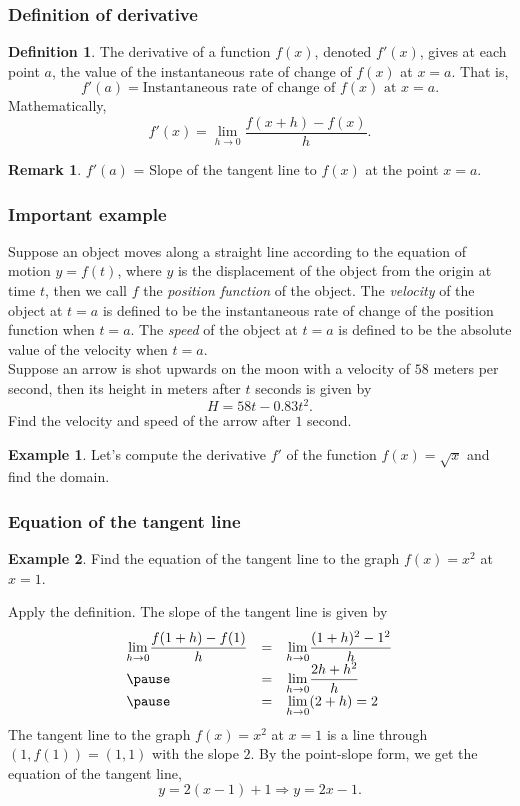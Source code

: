 \documentclass[t]{beamer}
\theoremstyle{plain}
\theoremstyle{definition}
\newtheorem{dfn}{Definition}
\newtheorem{rem}[prop]{Remark}
\newtheorem{ex}{Example}[section]
\newcommand{\nin}{\noindent}
\newcommand{\disp}{\displaystyle}
\begin{document}
\frame
{
\frametitle{Definition of derivative}
\begin{dfn}
The derivative of a function $f(x)$, denoted $f'(x)$, gives at each point $a$, the value of the instantaneous rate of change of $f(x)$ at $x=a$.
That is, \[ f'(a)=\text{Instantaneous rate of change of }f(x)\text{ at }x=a.\]\pause
Mathematically,
\[ f'(x)=\lim_{h\to 0}\frac{f(x+h)-f(x)}{h}.\]
\end{dfn}
\begin{rem}
$f'(a)$ = Slope of the tangent line to $f(x)$ at the point $x=a$.
\end{rem}
}

\begin{frame}
\frametitle{Important example}

\noindent Suppose an object moves along a straight line according to the equation of motion $y = f(t)$, where $y$ is the displacement of the object from the origin at time $t$, then we call $f$ the \emph{position function} of the object.  The \emph{velocity} of the object at $t=a$ is defined to be the instantaneous rate of change of the position function when $t=a$.  The \emph{speed} of the object at $t=a$ is defined to be the absolute value of the velocity when $t=a$.\\

\noindent Suppose an arrow is shot upwards on the moon with a velocity of $58$ meters per second, then its height in meters after $t$ seconds is given by
\[H = 58t - 0.83t^{2}.\]
Find the velocity and speed of the arrow after $1$ second.
\end{frame}
 
\begin{frame}
\begin{ex}
Let's compute the derivative $f'$ of the function $f(x) = \sqrt{x}$ and find the domain.\end{ex}
\end{frame}


\frame
{
\frametitle{Equation of the tangent line}
\begin{ex}
Find the equation of the tangent line to the graph 
 $f(x)= x^2$ at $x=1$. \pause
 
 
\nin{\underline{\bf Solution:}} Apply the definition. The slope of the tangent line 
is given by\vspace*{-7mm} 
\[\begin{array}{lcl}
\disp{\lim_{h\to 0}} \dfrac{f(1+h)-f(1)}{h} &=& \disp{\lim_{h\to 0}} \dfrac{(1+h)^2- 1^2}{h}\\ \pause
&=& \disp{\lim_{h\to 0}} \dfrac{2h+h^2}{h}\\ \pause
&=& \disp{\lim_{h\to 0}}  (2+h) =2 \end{array}\] \pause
The tangent line to the graph 
 $f(x)= x^2$ at $x=1$ is a line through $(1, f(1))=(1, 1)$ with the slope $2$. \pause By the
 point-slope form, we get the equation of the tangent line,\vspace*{-4mm}
 \[
 y = 2(x-1) +1\Longrightarrow y= 2x-1.
 \]
 \end{ex}
 }
\end{document}
